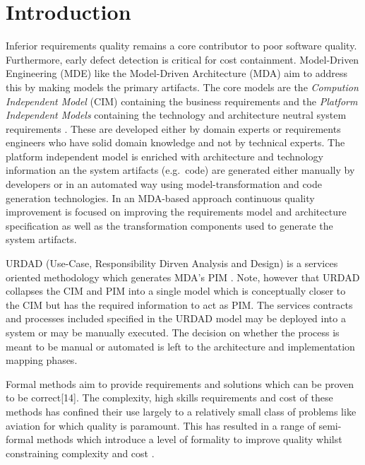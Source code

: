 \section{Introduction}\label{sec:Introduction}

Inferior requirements quality remains a core contributor to poor software quality\cite{heck_experiences_2008,_strategies_2011}. Furthermore, early defect detection is critical for cost containment\cite{betterRefernceThanBoehm1981WhichReliesOnWaterfall}. Model-Driven Engineering (MDE) like the Model-Driven Architecture (MDA) \cite{frankel_model_2003} aim to address this by making models the primary artifacts. The core models are the \emph{Compution Independent Model} (CIM) containing the business requirements and the \emph{Platform Independent Models} containing the technology and architecture neutral system requirements \cite{needAGoodCitation}. These are developed either by domain experts or requirements engineers who have solid domain knowledge and not by technical experts. The platform independent model is enriched with architecture and technology information an the system artifacts (e.g.\ code) are generated either manually by developers or in an automated way using model-transformation and code generation technologies. In an MDA-based approach continuous quality improvement is focused on improving the requirements model and architecture specification as well as the transformation components used to generate the system artifacts.

URDAD (Use-Case, Responsibility Dirven Analysis and Design) \cite{solms_technology_2007} is a services oriented methodology which generates MDA's PIM \cite{solms_generating_2009}. Note, however that URDAD collapses the CIM and PIM into a single model which is conceptually closer to the CIM but has the required information to act as PIM. The services contracts and processes included specified in the URDAD model may be deployed into a system or may be manually executed. The decision on whether the process is meant to be manual or automated is left to the architecture and implementation mapping phases. 

Formal methods aim to provide requirements and solutions which can be proven to be correct[14]. The complexity, high skills requirements and cost of these methods \cite{} has confined their use largely to a relatively small class of problems like aviation \cite{Hall} for which quality is paramount. This has resulted in a range of semi-formal methods which introduce a level of formality to improve quality whilst constraining complexity and cost \cite{}.

